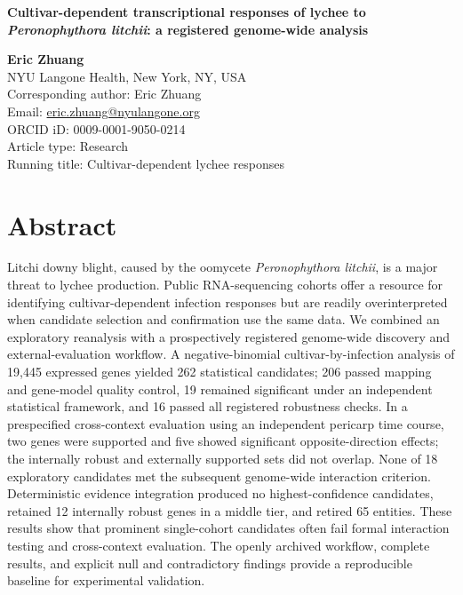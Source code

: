 \documentclass[12pt,letterpaper]{article}
\begin{document}
\linenumbers
\thispagestyle{fancy}


\begin{center}

{\normalsize\bfseries Cultivar-dependent transcriptional responses of lychee to \textit{Peronophythora litchii}: a registered genome-wide analysis\par}

\vspace{1.5em}

\textbf{Eric Zhuang}\\

NYU Langone Health, New York, NY, USA\\

Corresponding author: Eric Zhuang\\

Email: \href{mailto:eric.zhuang@nyulangone.org}{eric.zhuang@nyulangone.org}\\

ORCID iD: 0009-0001-9050-0214\\

Article type: Research\\

Running title: Cultivar-dependent lychee responses

\end{center}

\section*{Abstract}

Litchi downy blight, caused by the oomycete \textit{Peronophythora litchii}, is a major threat to lychee production. Public RNA-sequencing cohorts offer a resource for identifying cultivar-dependent infection responses but are readily overinterpreted when candidate selection and confirmation use the same data. We combined an exploratory reanalysis with a prospectively registered genome-wide discovery and external-evaluation workflow. A negative-binomial cultivar-by-infection analysis of 19,445 expressed genes yielded 262 statistical candidates; 206 passed mapping and gene-model quality control, 19 remained significant under an independent statistical framework, and 16 passed all registered robustness checks. In a prespecified cross-context evaluation using an independent pericarp time course, two genes were supported and five showed significant opposite-direction effects; the internally robust and externally supported sets did not overlap. None of 18 exploratory candidates met the subsequent genome-wide interaction criterion. Deterministic evidence integration produced no highest-confidence candidates, retained 12 internally robust genes in a middle tier, and retired 65 entities. These results show that prominent single-cohort candidates often fail formal interaction testing and cross-context evaluation. The openly archived workflow, complete results, and explicit null and contradictory findings provide a reproducible baseline for experimental validation.
\end{document}
